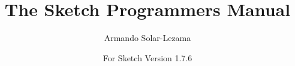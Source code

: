 \documentclass{article}
\newcommand{\version}{1.7.6}
\begin{document}

\title{The Sketch Programmers Manual}
\author{Armando Solar-Lezama}
\date{For Sketch Version \version{}}
\maketitle

\tableofcontents

\newpage






\newpage


\let\glossarysection=\section
\renewcommand{\glossarypreamble}{\label{glossary}This is a glossary of flags}
\printglossary[title=Glossary of Flags]
\end{document}
